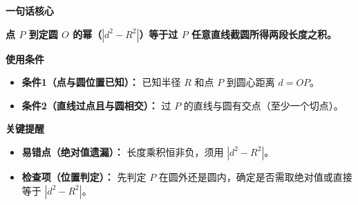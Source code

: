 \begin{summarybox}
	\textbf{\textcolor{CSummary}{一句话核心}}

	\textbf{点 $P$ 到定圆 $O$ 的幂（$|d^{2}-R^{2}|$）等于过 $P$ 任意直线截圆所得两段长度之积。}

	\medskip
	\textbf{\textcolor{CSummary}{使用条件}}
	\begin{itemize}[leftmargin=*, itemsep=0.5em, topsep=0.4em]
		\item \textbf{条件1（点与圆位置已知）：} 已知半径 $R$ 和点 $P$ 到圆心距离 $d=OP$。
		\item \textbf{条件2（直线过点且与圆相交）：} 过 $P$ 的直线与圆有交点（至少一个切点）。
	\end{itemize}

	\medskip
	\textbf{\textcolor{CSummary}{关键提醒}}
	\begin{itemize}[leftmargin=*, itemsep=0.5em, topsep=0.4em]
		\item \textbf{易错点（绝对值遗漏）：} 长度乘积恒非负，须用 $|d^{2}-R^{2}|$。
		\item \textbf{检查项（位置判定）：} 先判定 $P$ 在圆外还是圆内，确定是否需取绝对值或直接等于 $|d^{2}-R^{2}|$。
	\end{itemize}
\end{summarybox}
